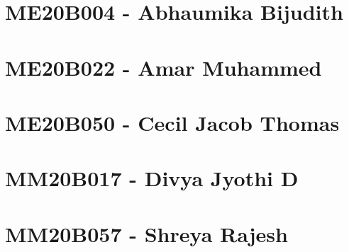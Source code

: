 \documentclass[12pt]{article}
\begin{document}
\newpage

\tableofcontents

\newpage

\section{ME20B004 - Abhaumika Bijudith}

\section{ME20B022 - Amar Muhammed}


\section{ME20B050 - Cecil Jacob Thomas}


\section{MM20B017 - Divya Jyothi D}

\newpage

\section{MM20B057 - Shreya Rajesh}


\newpage



\end{document}
